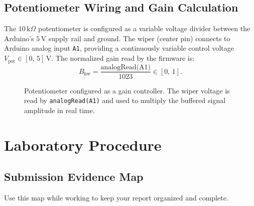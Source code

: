 \documentclass[11pt,letterpaper]{article}
\begin{document}
\subsection{Potentiometer Wiring and Gain Calculation}

The $10\,\text{k}\Omega$ potentiometer is configured as a variable voltage divider between the Arduino's $5\,\text{V}$ supply rail and ground. The wiper (center pin) connects to Arduino analog input \texttt{A1}, providing a continuously variable control voltage $V_{\text{pot}} \in [0,\, 5]\,\text{V}$. The normalized gain read by the firmware is:
\begin{equation}
    B_{\text{hw}} = \frac{\text{analogRead(A1)}}{1023} \in [0,\, 1].
    \label{eq:pot_gain}
\end{equation}

\begin{figure}[H]
    \centering
    \vspace{0.2in}
    \vspace{0.2in}
    \caption{Potentiometer configured as a gain controller. The wiper voltage is read by \texttt{analogRead(A1)} and used to multiply the buffered signal amplitude in real time.}
    \label{fig:pot_schematic}
\end{figure}

\clearpage

\clearpage

\section{Laboratory Procedure}

\subsection{Submission Evidence Map}
Use this map while working to keep your report organized and complete.
\end{document}
